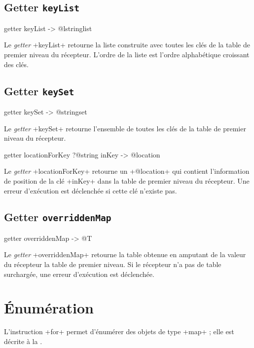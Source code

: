 \subsection{Getter \texttt{keyList}}

\begin{galgas}
getter keyList -> @lstringlist
\end{galgas}


Le \emph{getter} \ggs+keyList+ retourne la liste construite avec toutes les clés de la table de premier niveau du récepteur. L'ordre de la liste est l'ordre alphabétique croissant des clés.



\subsection{Getter \texttt{keySet}}

\begin{galgas}
getter keySet -> @stringset
\end{galgas}


Le \emph{getter} \ggs+keySet+ retourne l'ensemble de toutes les clés de la table de premier niveau du récepteur.






\begin{galgas}
getter locationForKey ?@string inKey -> @location
\end{galgas}


Le \emph{getter} \ggs+locationForKey+ retourne un \ggs+@location+ qui contient l'information de position de la clé \ggs+inKey+ dans la table de premier niveau du récepteur. Une erreur d'exécution est déclenchée si cette clé n'existe pas.








\subsection{Getter \texttt{overriddenMap}}

\begin{galgas}
getter overriddenMap -> @T
\end{galgas}


Le \emph{getter} \ggs+overriddenMap+ retourne la table obtenue en amputant de la valeur du récepteur la table de premier niveau. Si le récepteur n'a pas de table surchargée, une erreur d'exécution est déclenchée.



\section{Énumération}

L'instruction \ggs+for+ permet d'énumérer des objets de type \ggs+map+ ; elle est décrite à la .

